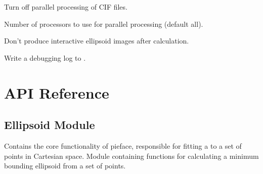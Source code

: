 \documentclass[a4paper,10pt,openany, oneside]{sphinxmanual}
\begin{document}

\begin{fulllineitems}
\label{script_input:cmdoption-CIFellipsoid-U}
Turn off parallel processing of CIF files.

\end{fulllineitems}


\begin{fulllineitems}
\label{script_input:cmdoption-CIFellipsoid--procs}
Number of processors to use for parallel processing (default all).

\end{fulllineitems}


\begin{fulllineitems}
\label{script_input:cmdoption-CIFellipsoid--noplot}
Don't produce interactive ellipsoid images after calculation.

\end{fulllineitems}


\begin{fulllineitems}
\label{script_input:cmdoption-CIFellipsoid--writelog}
Write a debugging log to .

\end{fulllineitems}



\chapter{API Reference}
\label{api_reference:api}\label{api_reference:api-reference}\label{api_reference:citation}\label{api_reference::doc}

\section{Ellipsoid Module}
\label{api_reference:ellipsoid-module}
Contains the core functionality of pieface, responsible for fitting a {\hyperref[glossary:term\string-mbe]{}} to a set of points in Cartesian space.
\label{api_reference:module-distellipsoid.ellipsoid}
Module containing functions for calculating a minimum bounding ellipsoid from a set of points.
\end{document}
